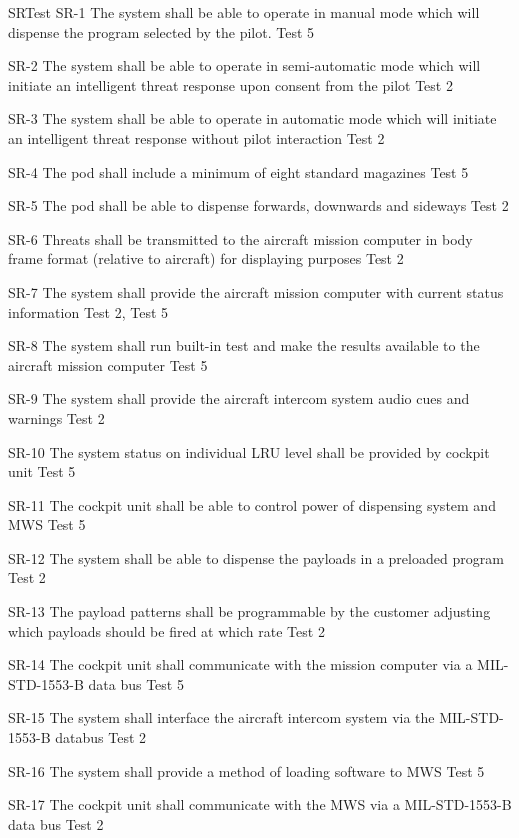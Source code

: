 \documentclass[Main]{subfiles}
\begin{document}
\begin{TraceForward}{SR}{Test}\label{ForwardTrace}
\TF
{SR-1}
{The system shall be able to operate in manual mode which will dispense the program selected by the pilot.}
{Test 5}

\TF
{SR-2}
{The system shall be able to operate in semi-automatic mode which will initiate an intelligent threat response upon consent from the pilot}
{Test 2}

\TF
{SR-3}
{The system shall be able to operate in automatic mode which will initiate an intelligent threat response without pilot interaction}
{Test 2}

\TF
{SR-4}
{The pod shall include a minimum of eight standard magazines}
{Test 5}

\TF
{SR-5}
{The pod shall be able to dispense forwards, downwards and sideways}
{Test 2}

\TF
{SR-6}
{Threats shall be transmitted to the aircraft mission computer in body frame format (relative to aircraft) for displaying purposes}
{Test 2}

\TF
{SR-7}
{The system shall provide the aircraft mission computer with current status information}
{Test 2, Test 5}

\TF
{SR-8}
{The system shall run built-in test and make the results available to the aircraft mission computer}
{Test 5}

\TF
{SR-9}
{The system shall provide the aircraft intercom system audio cues and warnings}
{Test 2}

\TF
{SR-10}
{The system status on individual LRU level shall be provided by cockpit unit}
{Test 5}

\TF
{SR-11}
{The cockpit unit shall be able to control power of dispensing system and MWS}
{Test 5}

\TF
{SR-12}
{The system shall be able to dispense the payloads in a preloaded program}
{Test 2}

\TF
{SR-13}
{The payload patterns shall be programmable by the customer adjusting which payloads should be fired at which rate}
{Test 2}

\TF
{SR-14}
{The cockpit unit shall communicate with the mission computer via a MIL-STD-1553-B data bus}
{Test 5}

\TF
{SR-15}
{The system shall interface the aircraft intercom system via the MIL-STD-1553-B databus}
{Test 2}

\TF
{SR-16}
{The system shall provide a method of loading software to MWS}
{Test 5}

\TF
{SR-17}
{The cockpit unit shall communicate with the MWS via a MIL-STD-1553-B data bus}
{Test 2}


\end{TraceForward}
\end{document}
